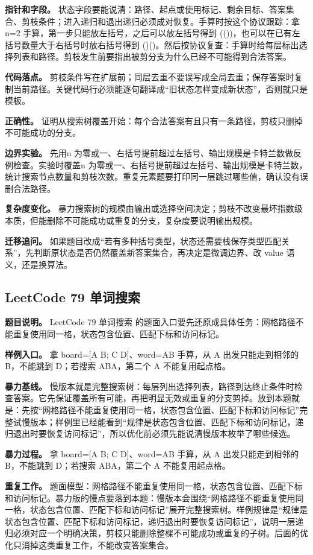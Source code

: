 \textbf{指针和字段。} 状态字段要能说清：路径、起点或使用标记、剩余目标、答案集合、剪枝条件；进入递归和退出递归必须成对恢复。手算时按这个协议跟踪：拿 n=2 手算，第一步只能放左括号，之后可以放左括号得到 (())，也可以在已有左括号数量大于右括号时放右括号得到 ()()。然后按协议复查：手算时给每层标出选择列表和路径。剪枝发生前要指出被剪分支为什么已经不可能得到合法答案。

\textbf{代码落点。} 剪枝条件写在扩展前；同层去重不要误写成全局去重；保存答案时复制当前路径。关键代码行必须能逐句翻译成“旧状态怎样变成新状态”，否则就只是模板。

\textbf{正确性。} 证明从搜索树覆盖开始：每个合法答案有且只有一条路径，剪枝只删掉不可能成功的分支。

\textbf{边界实验。} 先用n 为零或一、右括号提前超过左括号、输出规模是卡特兰数做反例检查。实验时覆盖n 为零或一、右括号提前超过左括号、输出规模是卡特兰数，统计搜索节点数量和剪枝次数。重复元素题要打印同一层跳过哪些值，确认没有误删合法路径。

\textbf{复杂度变化。} 暴力搜索树的规模由输出或选择空间决定；剪枝不改变最坏指数级本质，但能删除不可能成功或重复的分支，复杂度要说明输出规模。

\textbf{迁移追问。} 如果题目改成“若有多种括号类型，状态还需要栈保存类型匹配关系”，先判断原状态是否仍然覆盖新答案集合，再决定是微调边界、改 value 语义，还是换算法。

\subsection{LeetCode 79 单词搜索}

\textbf{题目说明。} LeetCode 79 单词搜索 的题面入口要先还原成具体任务：网格路径不能重复使用同一格，状态包含位置、匹配下标和访问标记。

\textbf{样例入口。} 拿 board=[A B; C D]、word=AB 手算，从 A 出发只能走到相邻的 B，不能跳到 D；若搜索 ABA，第二个 A 不能复用起点格。

\textbf{暴力基线。} 慢版本就是完整搜索树：每层列出选择列表，路径到达终止条件时检查答案。它先保证覆盖所有可能，再把明显无效或重复的分支剪掉。放到本题就是：先按“网格路径不能重复使用同一格，状态包含位置、匹配下标和访问标记”完整试慢版本；样例里已经能看到“规律是状态包含位置、匹配下标和访问标记，递归退出时要恢复访问标记”，所以优化前必须先能说清慢版本枚举了哪些候选。

\textbf{暴力过程。} 拿 board=[A B; C D]、word=AB 手算，从 A 出发只能走到相邻的 B，不能跳到 D；若搜索 ABA，第二个 A 不能复用起点格。

\textbf{重复工作。} 题面模型：网格路径不能重复使用同一格，状态包含位置、匹配下标和访问标记。暴力版的慢点要落到本题：慢版本会围绕“网格路径不能重复使用同一格，状态包含位置、匹配下标和访问标记”展开完整搜索树。样例规律是“规律是状态包含位置、匹配下标和访问标记，递归退出时要恢复访问标记”，说明一层递归必须对应一个明确决策，剪枝只能删除整棵不可能成功或重复的子树。后面的优化只消掉这类重复工作，不能改变答案集合。

